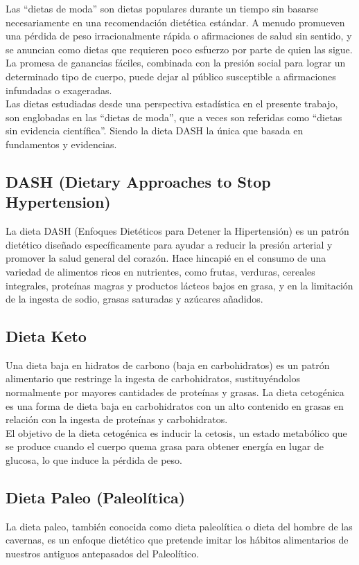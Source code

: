 \documentclass[12pt,a4paper]{article}
\begin{document}
Las ``dietas de moda'' son dietas populares durante un tiempo sin basarse 
necesariamente en una recomendación dietética estándar. A menudo promueven 
una pérdida de peso irracionalmente rápida o afirmaciones de salud sin 
sentido, y se anuncian como dietas que requieren poco esfuerzo por parte de 
quien las sigue. La promesa de ganancias fáciles, combinada con la presión 
social para lograr un determinado tipo de cuerpo, puede dejar al público 
susceptible a afirmaciones infundadas o exageradas.\cite{marvastipopular} \\

Las dietas estudiadas desde una perspectiva estadística en el presente 
trabajo, son englobadas en las ``dietas de moda'', que a veces son referidas 
como ``dietas sin evidencia científica''. Siendo  la dieta DASH la única 
que basada en fundamentos y evidencias.

\subsection{DASH (Dietary Approaches to Stop Hypertension)}
\cite{marvastipopular} La dieta DASH (Enfoques Dietéticos para Detener la 
Hipertensión) es un patrón dietético diseñado específicamente para ayudar 
a reducir la presión arterial y promover la salud general del corazón. Hace 
hincapié en el consumo de una variedad de alimentos ricos en nutrientes, 
como frutas, verduras, cereales integrales, proteínas magras y productos 
lácteos bajos en grasa, y en la limitación de la ingesta de sodio, grasas 
saturadas y azúcares añadidos. 

\subsection{Dieta Keto}
\cite{marvastipopular} Una dieta baja en hidratos de carbono (baja en 
carbohidratos) es un patrón alimentario que restringe la ingesta de 
carbohidratos, sustituyéndolos normalmente por mayores cantidades de 
proteínas y grasas. La dieta cetogénica es una forma de dieta baja en 
carbohidratos con un alto contenido en grasas en relación con la ingesta 
de proteínas y carbohidratos.\\

El objetivo de la dieta cetogénica es inducir la cetosis, un estado 
metabólico que se produce cuando el cuerpo quema grasa para obtener 
energía en lugar de glucosa, lo que induce la pérdida de peso.

\subsection{Dieta Paleo (Paleolítica)}
\cite{marvastipopular} La dieta paleo, también conocida como dieta 
paleolítica o dieta del hombre de las cavernas, es un enfoque 
dietético que pretende imitar los hábitos alimentarios de nuestros 
antiguos antepasados del Paleolítico. \\
\end{document}
